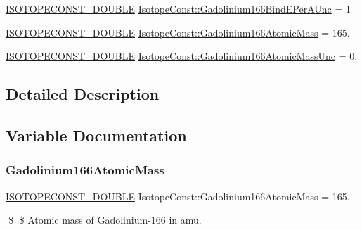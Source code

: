 \begin{DoxyCompactItemize}
\mbox{\hyperlink{group___isotope_const-_macros_ga8f45a7272ce02c0b4c65c44636ed719a}{I\+S\+O\+T\+O\+P\+E\+C\+O\+N\+S\+T\+\_\+\+D\+O\+U\+B\+LE}} \mbox{\hyperlink{group___isotope_const-_gadolinium-_gd166_ga083f751d6ff2ed65538f8683600befff}{Isotope\+Const\+::\+Gadolinium166\+Bind\+E\+Per\+A\+Unc}} = 1
\item 
\mbox{\hyperlink{group___isotope_const-_macros_ga8f45a7272ce02c0b4c65c44636ed719a}{I\+S\+O\+T\+O\+P\+E\+C\+O\+N\+S\+T\+\_\+\+D\+O\+U\+B\+LE}} \mbox{\hyperlink{group___isotope_const-_gadolinium-_gd166_ga738beb2d12b4df2da0f134f94a2e27f3}{Isotope\+Const\+::\+Gadolinium166\+Atomic\+Mass}} = 165.
\item 
\mbox{\hyperlink{group___isotope_const-_macros_ga8f45a7272ce02c0b4c65c44636ed719a}{I\+S\+O\+T\+O\+P\+E\+C\+O\+N\+S\+T\+\_\+\+D\+O\+U\+B\+LE}} \mbox{\hyperlink{group___isotope_const-_gadolinium-_gd166_ga22cab7eab32de68b054b0d887c455ae8}{Isotope\+Const\+::\+Gadolinium166\+Atomic\+Mass\+Unc}} = 0.
\end{DoxyCompactItemize}


\subsection{Detailed Description}


\subsection{Variable Documentation}
\mbox{\label{group___isotope_const-_gadolinium-_gd166_ga738beb2d12b4df2da0f134f94a2e27f3}} 
\subsubsection{\texorpdfstring{Gadolinium166\+Atomic\+Mass}{Gadolinium166AtomicMass}}
{\footnotesize\ttfamily \mbox{\hyperlink{group___isotope_const-_macros_ga8f45a7272ce02c0b4c65c44636ed719a}{I\+S\+O\+T\+O\+P\+E\+C\+O\+N\+S\+T\+\_\+\+D\+O\+U\+B\+LE}} Isotope\+Const\+::\+Gadolinium166\+Atomic\+Mass = 165.}

\$ \$ Atomic mass of Gadolinium-\/166 in amu. \mbox{\label{group___isotope_const-_gadolinium-_gd166_ga22cab7eab32de68b054b0d887c455ae8}} 

